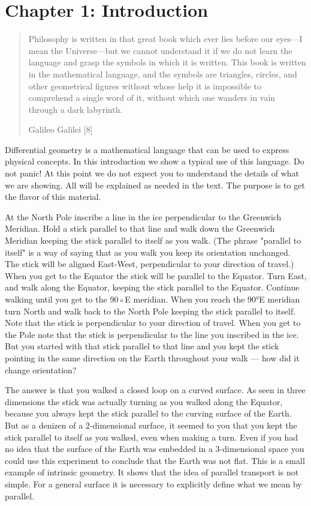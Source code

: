 \documentclass[11pt]{article}
\author{Sam Ritchie}
\date{\today}
\title{}
\begin{document}
\tableofcontents


\section{Chapter 1: Introduction}
\label{sec:orgdbe4a79}

\begin{quote}
Philosophy is written in that great book which ever lies before our eyes—I mean
the Universe—but we cannot understand it if we do not learn the language and
grasp the symbols in which it is written. This book is written in the
mathematical language, and the symbols are triangles, circles, and other
geometrical figures without whose help it is impossible to comprehend a single
word of it, without which one wanders in vain through a dark labyrinth.

Galileo Galilei [8]
\end{quote}

Differential geometry is a mathematical language that can be used to express
physical concepts. In this introduction we show a typical use of this language.
Do not panic! At this point we do not expect you to understand the details of
what we are showing. All will be explained as needed in the text. The purpose is
to get the flavor of this material.

At the North Pole inscribe a line in the ice perpendicular to the Greenwich
Meridian. Hold a stick parallel to that line and walk down the Greenwich
Meridian keeping the stick parallel to itself as you walk. (The phrase "parallel
to itself" is a way of saying that as you walk you keep its orientation
unchanged. The stick will be aligned East-West, perpendicular to your direction
of travel.) When you get to the Equator the stick will be parallel to the
Equator. Turn East, and walk along the Equator, keeping the stick parallel to
the Equator. Continue walking until you get to the 90◦E meridian. When you reach
the 90°E meridian turn North and walk back to the North Pole keeping the stick
parallel to itself. Note that the stick is perpendicular to your direction of
travel. When you get to the Pole note that the stick is perpendicular to the
line you inscribed in the ice. But you started with that stick parallel to that
line and you kept the stick pointing in the same direction on the Earth
throughout your walk --- how did it change orientation?

The answer is that you walked a closed loop on a curved surface. As seen in
three dimensions the stick was actually turning as you walked along the Equator,
because you always kept the stick parallel to the curving surface of the Earth.
But as a denizen of a 2-dimensional surface, it seemed to you that you kept the
stick parallel to itself as you walked, even when making a turn. Even if you had
no idea that the surface of the Earth was embedded in a 3-dimensional space you
could use this experiment to conclude that the Earth was not flat. This is a
small example of intrinsic geometry. It shows that the idea of parallel
transport is not simple. For a general surface it is necessary to explicitly
define what we mean by parallel.
\end{document}
